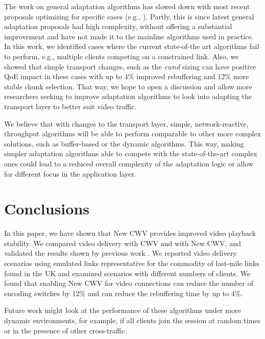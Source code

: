\documentclass[10pt,sigconf,anonymous]{acmart}
\begin{document}
The work on general adaptation algorithms has slowed down with most recent proposals optimizing for specific cases (e.g., \cite{Karagkioules-2020-achieving-low-latency}). Partly, this is since latest general adaptation proposals had high complexity, without offering a substantial improvement \cite{Yin-2015-a-control-theoritic-approach} and have not made it to the mainline algorithms used in practice. In this work, we identified cases where the current state-of-the art algorithms fail to perform, e.g., multiple clients competing on a constrained link. Also, we showed that simple transport changes, such as the \emph{cwnd} sizing can have positive QoE impact in these cases with up to 4\% improved rebuffering and 12\% more stable chunk selection. That way, we hope to open a discussion and allow more researchers seeking to improve adaptation algorithms to look into adapting the transport layer to better suit video traffic.

We believe that with changes to the transport layer, simple, network-reactive, throughput algorithms will be able to perform comparable to other more complex solutions, such as buffer-based or the dynamic algorithms. This way, making simpler adaptation algorithms able to compete with the state-of-the-art complex ones could lead to a reduced overall complexity of the adaptation logic or allow for different focus in the application layer.

\section{Conclusions}
\label{sec:conclusion}

In this paper, we have shown that New CWV provides improved video playback stability. We compared video delivery with CWV and with New CWV, and validated the results shown by previous work \cite{Nazir-2014-performance-evaluation-congestion-window-validation-dash-newcwv}. We reported video delivery scenarios using emulated links representative for the commodity of last-mile links found in the UK and examined scenarios with different numbers of clients. We found that enabling New CWV for video connections can reduce the number of encoding switches by 12\% and can reduce the rebuffering time by up to 4\%.

Future work might look at the performance of these algorithms under more dynamic environments, for example, if all clients join the session at random times or in the presence of other cross-traffic. 
\end{document}
